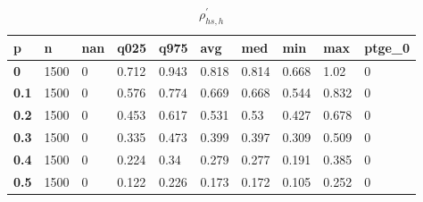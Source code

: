 \begin{table}[h]
 \centering 
\footnotesize
\caption{$\rho_{hs,h}^\prime $}
\label{tab:alphahsh}
\begin{tabular}[h]{|l|l|l|l|l|l|l|l|l|l|
    } \hline
\textbf{ p} & \textbf{ n} & \textbf{ nan} & \textbf{ q025} & \textbf{ q975} & \textbf{ avg} & \textbf{ med} & \textbf{ min} & \textbf{ max} & \textbf{ ptge\_0}
    \\ \hline
  \textbf{  0} & 1500 & 0 & 0.712 & 0.943 & 0.818 & 0.814 & 0.668 &  1.02 & 0
    \\ \hline
  \textbf{0.1} & 1500 & 0 & 0.576 & 0.774 & 0.669 & 0.668 & 0.544 & 0.832 & 0
    \\ \hline
  \textbf{0.2} & 1500 & 0 & 0.453 & 0.617 & 0.531 &  0.53 & 0.427 & 0.678 & 0
    \\ \hline
  \textbf{0.3} & 1500 & 0 & 0.335 & 0.473 & 0.399 & 0.397 & 0.309 & 0.509 & 0
    \\ \hline
  \textbf{0.4} & 1500 & 0 & 0.224 &  0.34 & 0.279 & 0.277 & 0.191 & 0.385 & 0
    \\ \hline
  \textbf{0.5} & 1500 & 0 & 0.122 & 0.226 & 0.173 & 0.172 & 0.105 & 0.252 & 0
    \\ \hline
 \end{tabular}
 \end{table}
